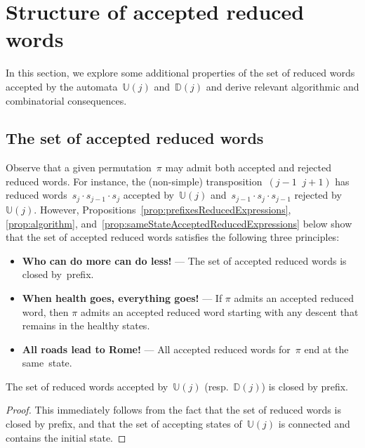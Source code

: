 \documentclass[ALCO]{cedram}
\newcommand{\automatonU}{\mathbb{U}}
\newcommand{\automatonD}{\mathbb{D}}
\begin{document}
\section{Structure of accepted reduced words}\label{sec:algorithmicCombinatorialConsequences}

In this section, we explore some additional properties of the set of reduced words accepted by the automata~$\automatonU(j)$ and~$\automatonD(j)$ and derive relevant algorithmic and combinatorial consequences.

\subsection{The set of accepted reduced words}\label{subsec:principles}

Observe that a given permutation~$\pi$ may admit both accepted and rejected reduced words.
For instance, the (non-simple) transposition~${(j-1 \;\; j+1)}$ has reduced words~$s_j \cdot s_{j-1} \cdot s_j$ accepted by~$\automatonU(j)$ and~$s_{j-1} \cdot s_j \cdot s_{j-1}$ rejected by~$\automatonU(j)$.
However, Propositions~\ref{prop:prefixesReducedExpressions}, \ref{prop:algorithm}, and~\ref{prop:sameStateAcceptedReducedExpressions} below show that the set of accepted reduced words satisfies the following three principles:
\begin{itemize}
	\item \textbf{Who can do more can do less!} --- The set of accepted reduced words is closed by~prefix.
	\item \textbf{When health goes, everything goes!} --- If $\pi$ admits an accepted reduced word, then $\pi$ admits an accepted reduced word starting with any descent that remains in the healthy states.
	\item \textbf{All roads lead to Rome!} --- All accepted reduced words for~$\pi$ end at the same~state.
\end{itemize}

\begin{prop}\label{prop:prefixesReducedExpressions}
The set of reduced words accepted by~$\automatonU(j)$ (resp.~$\automatonD(j)$) is closed by prefix.
\end{prop}

\begin{proof}
This immediately follows from the fact that the set of reduced words is closed by prefix, and that the set of accepting states of~$\automatonU(j)$ is connected and contains the initial state.
\end{proof}
\end{document}
